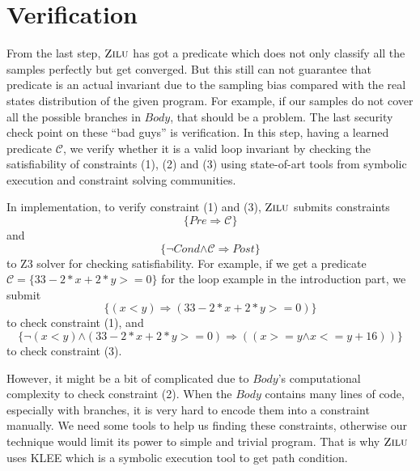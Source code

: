 
\section{Verification} %
\label{sec:verification}
From the last step, $\textsc{Zilu}$ has got a predicate which does not only classify all the samples perfectly but get converged.
But this still can not guarantee that predicate is an actual invariant due to the sampling bias compared with the real states distribution of the given program.
For example, if our samples do not cover all the possible branches in $Body$, that should be a problem.
The last security check point on these ``bad guys'' is verification. 
In this step, having a learned predicate $\mathcal{C}$, we verify whether it is a valid loop invariant by
checking the satisfiability of constraints (1), (2) and (3) using state-of-art tools from symbolic execution and constraint solving communities.

In implementation, to verify constraint (1) and (3), 
$\textsc{Zilu}$ submits constraints $$\{Pre \Rightarrow \mathcal{C}\}$$ and $$\{\neg {Cond} \boldsymbol{\wedge} \mathcal{C} \Rightarrow Post\}$$ to Z3 solver for checking satisfiability.
For example, if we get a predicate $\mathcal{C} = \{33-2*x+2*y>=0\}$
for the loop example in the introduction part, 
we submit 
$$\{(x<y) \Rightarrow (33-2*x+2*y>=0)\}$$
to check constraint (1), 
and 
$$\{\neg(x<y) \boldsymbol{\wedge} (33-2*x+2*y>=0) \Rightarrow ((x >= y \boldsymbol{\wedge} x <= y + 16))\}$$
to check constraint (3).

However, it might be a bit of complicated due to $Body$'s computational complexity to check constraint (2).
When the $Body$ contains many lines of code, especially with branches, it is very hard to encode them into a constraint manually.
We need some tools to help us finding these constraints, otherwise our technique would limit its power to simple and trivial program. 
That is why $\textsc{Zilu}$ uses KLEE\cite{cadar2008klee} which is a symbolic execution tool to get path condition.





